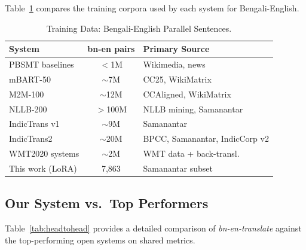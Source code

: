 \documentclass[conference]{IEEEtran}
\begin{document}
Table~\ref{tab:data} compares the training corpora used by each system
for Bengali-English.

\begin{table}[t]
  \centering
  \caption{Training Data: Bengali-English Parallel Sentences.}
  \label{tab:data}
  \small
  \setlength{\tabcolsep}{3pt}
  \begin{tabular}{p{3.0cm} c p{3.0cm}}
    \toprule
    \textbf{System} & \textbf{bn-en pairs} & \textbf{Primary Source} \\
    \midrule
    PBSMT baselines  & $<$1M    & Wikimedia, news \\
    mBART-50         & $\sim$7M & CC25, WikiMatrix \\
    M2M-100          & $\sim$12M& CCAligned, WikiMatrix \\
    NLLB-200         & $>$100M  & NLLB mining, Samanantar \\
    IndicTrans v1    & $\sim$9M & Samanantar \\
    IndicTrans2      & $\sim$20M& BPCC, Samanantar, IndicCorp v2 \\
    WMT2020 systems  & $\sim$2M & WMT data + back-transl. \\
    This work (LoRA) & 7,863    & Samanantar subset \\
    \bottomrule
  \end{tabular}
\end{table}

\subsection{Our System vs.\ Top Performers}

Table~\ref{tab:headtohead} provides a detailed comparison of
\textit{bn-en-translate} against the top-performing open systems on
shared metrics.
\end{document}
